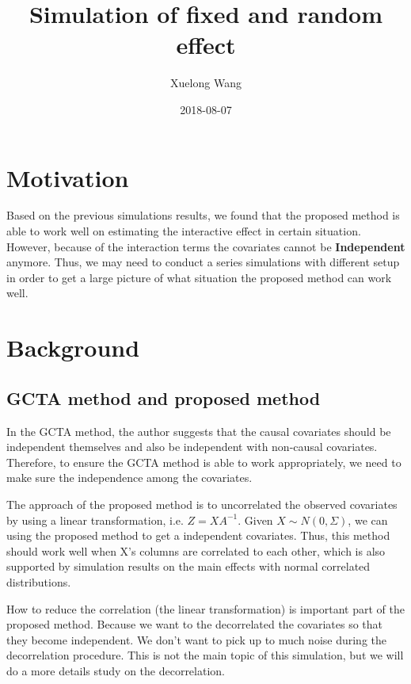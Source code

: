 \documentclass[]{article}
\title{Simulation of fixed and random effect}
\author{Xuelong Wang}
\date{2018-08-07}
\begin{document}
\maketitle

{
\setcounter{tocdepth}{2}
\tableofcontents
}
\section{Motivation}\label{motivation}

Based on the previous simulations results, we found that the proposed
method is able to work well on estimating the interactive effect in
certain situation. However, because of the interaction terms the
covariates cannot be \textbf{Independent} anymore. Thus, we may need to
conduct a series simulations with different setup in order to get a
large picture of what situation the proposed method can work well.

\section{Background}\label{background}

\subsection{GCTA method and proposed
method}\label{gcta-method-and-proposed-method}

In the GCTA method, the author suggests that the causal covariates
should be independent themselves and also be independent with non-causal
covariates. Therefore, to ensure the GCTA method is able to work
appropriately, we need to make sure the independence among the
covariates.

The approach of the proposed method is to uncorrelated the observed
covariates by using a linear transformation, i.e. \(Z = XA^{-1}\). Given
\(X \sim N(0, \Sigma)\), we can using the proposed method to get a
independent covariates. Thus, this method should work well when X's
columns are correlated to each other, which is also supported by
simulation results on the main effects with normal correlated
distributions.

How to reduce the correlation (the linear transformation) is important
part of the proposed method. Because we want to the decorrelated the
covariates so that they become independent. We don't want to pick up to
much noise during the decorrelation procedure. This is not the main
topic of this simulation, but we will do a more details study on the
decorrelation.
\end{document}
